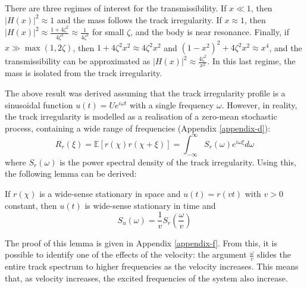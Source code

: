 There are three regimes of interest for the transmissibility. If $x \ll 1$, then $|H(x)|^2 \approx 1$ and the mass follows the track irregularity. If $x \approx 1$, then $|H(x)|^2 \approx \frac{1+4\zeta^2}{4\zeta^2} \approx \frac{1}{4\zeta^2}$ for small $\zeta$, and the body is near resonance. Finally, if $x \gg \max(1, 2\zeta)$, then $1+4\zeta^2 x^2 \approx 4\zeta^2 x^2$ and $(1 - x^2)^2 + 4 \zeta^2 x^2 \approx x^4$, and the transmissibility can be approximated as $|H(x)|^2 \approx \frac{4\zeta^2}{x^2}$. In this last regime, the mass is isolated from the track irregularity.

The above result was derived assuming that the track irregularity profile is a sinusoidal function $u(t) = U e^{i \omega t}$ with a single frequency $\omega$. However, in reality, the track irregularity is modelled as a realisation of a zero-mean stochastic process, containing a wide range of frequencies (Appendix \ref{appendix-d}):
\begin{equation}
    R_r(\xi) = \mathbb{E}[r(\chi) r(\chi + \xi)] = \int_{-\infty}^{\infty} S_r(\omega) e^{i \omega \xi} d\omega
\end{equation}
where $S_r(\omega)$ is the power spectral density of the track irregularity. Using this, the following lemma can be derived:
\begin{lemma}
    If $r(\chi)$ is a wide-sense stationary in space and $u(t) = r(vt)$ with $v >0$ constant, then $u(t)$ is wide-sense stationary in time and
    \begin{equation}
        S_u(\omega) = \frac{1}{v}S_r\left(\frac{\omega}{v}\right)
        \label{eq:lemma}
    \end{equation}
\end{lemma}
The proof of this lemma is given in Appendix \ref{appendix-f}. From this, it is possible to identify one of the effects of the velocity: the argument $\frac{\omega}{v}$ slides the entire track spectrum to higher frequencies as the velocity increases. This means that, as velocity increases, the excited frequencies of the system also increase. 

